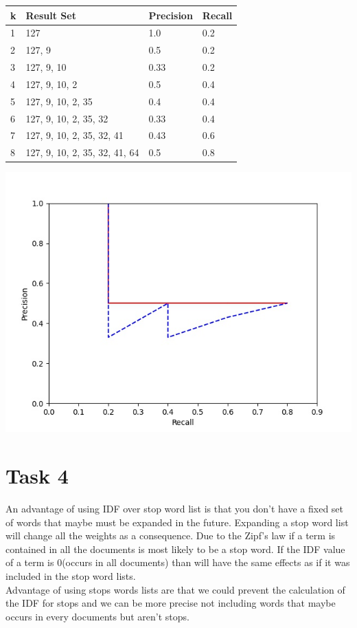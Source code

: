 \documentclass[a4paper]{scrartcl}
\begin{document}
\begin{center}
    \begin{tabular}{@{}llll@{}}
    \hline
    \textbf{k} & \textbf{Result Set}           & \textbf{Precision} & \textbf{Recall} \\ \hline
    1          & 127                           & 1.0                & 0.2             \\
    2          & 127, 9                        & 0.5                & 0.2             \\
    3          & 127, 9, 10                    & 0.33               & 0.2             \\
    4          & 127, 9, 10, 2                 & 0.5                & 0.4             \\
    5          & 127, 9, 10, 2, 35             & 0.4                & 0.4             \\
    6          & 127, 9, 10, 2, 35, 32         & 0.33               & 0.4             \\
    7          & 127, 9, 10, 2, 35, 32, 41     & 0.43               & 0.6             \\
    8          & 127, 9, 10, 2, 35, 32, 41, 64 & 0.5                & 0.8             \\ \hline
    \end{tabular}
    
    \includegraphics[width=.7\textwidth]{img/fig.jpg}
\end{center}

\section*{Task 4}

An advantage of using IDF over stop word list is that
you don't have a fixed set of words that maybe must be expanded in the future.
Expanding a stop word list will change all the weights as a consequence.
Due to the Zipf's law if a term is contained in all the documents is most likely to be a stop word.
If the IDF value of a term is 0(occurs in all documents) than will have the same effects as if it was included in the stop word lists.
\\
Advantage of using stops words lists are that we could prevent the calculation of the IDF for stops
and we can be more precise not including words that maybe occurs in every documents but aren't stops.
\end{document}

